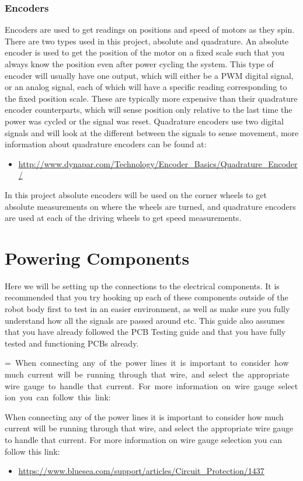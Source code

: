 \documentclass[12pt]{article}
\makeatletter
\newcommand{\mybox}[1]{%
  \setbox0=\hbox{#1}%
  \setlength{\@tempdima}{\dimexpr\wd0+13pt}%
  \begin{tcolorbox}[colframe=mycolor,boxrule=0.5pt,arc=4pt,
      left=6pt,right=6pt,top=6pt,bottom=6pt,boxsep=0pt,width=0.95\textwidth]
    #1
  \end{tcolorbox}
}
\makeatother
\begin{document}
\subsubsection{Encoders}
Encoders are used to get readings on positions and speed of motors as they spin. There are two types used in this project, absolute and quadrature. An absolute encoder is used to get the position of the motor on a fixed scale such that you always know the position even after power cycling the system. This type of encoder will usually have one output, which will either be a PWM digital signal, or an analog signal, each of which will have a specific reading corresponding to the fixed position scale. These are typically more expensive than their quadrature encoder counterparts, which will sense position only relative to the last time the power was cycled or the signal was reset. Quadrature encoders use two digital signals and will look at the different between the signals to sense movement, more information about quadrature encoders can be found at: 

\begin{itemize}
	\item \href{http://www.dynapar.com/Technology/Encoder_Basics/Quadrature_Encoder/}{http://www.dynapar.com/Technology/Encoder\_Basics/Quadrature\_Encoder/}  
\end{itemize}

\noindent In this project absolute encoders will be used on the corner wheels to get absolute measurements on where the wheels are turned, and quadrature encoders are used at each of the driving wheels to get speed measurements.


\section{Powering Components}
Here we will be setting up the connections to the electrical components. It is recommended that you try hooking up each of these components outside of the robot body first to test in an easier environment, as well as make sure you fully understand how all the signals are passed around etc. This guide also assumes that you have already followed the PCB Testing guide and that you have fully tested and functioning PCBs already.


\mybox{
When connecting any of the power lines it is important to consider how much current will be running through that wire, and select the appropriate wire gauge to handle that current. For more information on wire gauge selection you can follow this link:
}
\begin{itemize}
	\item \href{https://www.bluesea.com/support/articles/Circuit_Protection/1437/Part_1\%3A_Choosing_the_Correct_Wire_Size_for_a_DC_Circuit}{https://www.bluesea.com/support/articles/Circuit\_Protection/1437}
\end{itemize}
\end{document}
